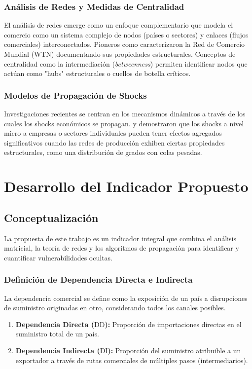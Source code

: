 \documentclass[final,1p,times,authoryear]{elsarticle}
\providecommand{\DD}{\mathrm{DD}}
\providecommand{\DI}{\mathrm{DI}}
\begin{document}
\subsubsection{Análisis de Redes y Medidas de Centralidad}
El análisis de redes emerge como un enfoque complementario que modela el comercio como un sistema complejo de nodos (países o sectores) y enlaces (flujos comerciales) interconectados. Pioneros como \cite{Fagiolo2010} caracterizaron la Red de Comercio Mundial (WTN) documentando sus propiedades estructurales. Conceptos de centralidad como la intermediación (\textit{betweenness}) permiten identificar nodos que actúan como "hubs" estructurales o cuellos de botella críticos.

\subsubsection{Modelos de Propagación de Shocks}
Investigaciones recientes se centran en los mecanismos dinámicos a través de los cuales los shocks económicos se propagan. \cite{Acemoglu2012} y \cite{Carvalho2013} demostraron que los shocks a nivel micro a empresas o sectores individuales pueden tener efectos agregados significativos cuando las redes de producción exhiben ciertas propiedades estructurales, como una distribución de grados con colas pesadas.

\section{Desarrollo del Indicador Propuesto}

\subsection{Conceptualización}
La propuesta de este trabajo es un indicador integral que combina el análisis matricial, la teoría de redes y los algoritmos de propagación para identificar y cuantificar vulnerabilidades ocultas.

\subsubsection{Definición de Dependencia Directa e Indirecta}
La dependencia comercial se define como la exposición de un país a disrupciones de suministro originadas en otro, considerando todos los canales posibles.
\begin{enumerate}
    \item \textbf{Dependencia Directa ($\DD$):} Proporción de importaciones directas en el suministro total de un país.
    \item \textbf{Dependencia Indirecta ($\DI$):} Proporción del suministro atribuible a un exportador a través de rutas comerciales de múltiples pasos (intermediarios).
\end{enumerate}
\end{document}
